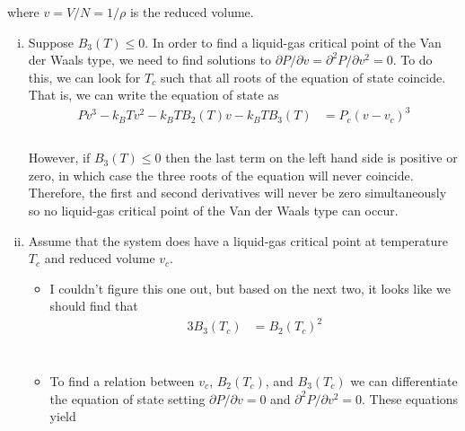 \documentclass[]{article}
\begin{document}
\begin{enumerate}[1.]
where $v = V/N = 1 /\rho$ is the reduced volume. \\ 

\begin{enumerate}[i.]


\item Suppose $B_3(T) \le 0$. In order to find a liquid-gas critical point of the Van der Waals type, we need to find solutions to $ \partial P /\partial v = \partial^2 P / \partial v^2 = 0$. To do this, we can look for $T_c$ such that all roots of the equation of state coincide. That is, we can write the equation of state as \\

\begin{equation}
\begin{aligned}
Pv^3 - k_B T v^2 - k_B T B_2(T) v - k_B T B_3(T) & = P_c ( v - v_c)^3  \\
\end{aligned}
\end{equation} \\

However, if $B_3(T) \le 0$ then the last term on the left hand side is positive or zero, in which case the three roots of the equation will never coincide. Therefore, the first and second derivatives will never be zero simultaneously so no liquid-gas critical point of the Van der Waals type can occur. \\

\item Assume that the system does have a liquid-gas critical point at temperature $T_c$ and reduced volume $v_c$. \\ 

\begin{itemize}

\item I couldn't figure this one out, but based on the next two, it looks like we should find that \\


\begin{equation}
\begin{aligned}
3  B_3 ( T_c ) & = B_2 ( T_c )^2 \\
\end{aligned}
\end{equation} \\





\item To find a relation between $v_c$, $B_2(T_c)$, and $B_3(T_c)$ we can differentiate the equation of state setting $ \partial P /\partial v = 0 $ and $ \partial^2 P / \partial v^2 = 0$. These equations yield \\


\end{itemize}
\end{enumerate}
\end{enumerate}
\end{document}
